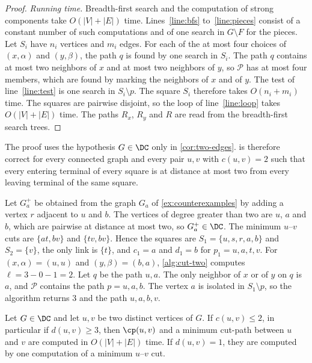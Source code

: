 \begin{proof}
\emph{Running time.}
Breadth-first search and the computation of strong components take $O(|V| + |E|)$ time.
Lines~\ref{line:bfs} to~\ref{line:pieces} consist of a constant number of such computations and of one search in $G \setminus F$ for the pieces.
Let $S_i$ have $n_i$ vertices and $m_i$ edges.
For each of the at most four choices of $(x, \alpha)$ and $(y, \beta)$, the path $q$ is found by one search in $S_i$.
The path $q$ contains at most two neighbors of $x$ and at most two neighbors of $y$, so $\mathcal{P}$ has at most four members, which are found by marking the neighbors of $x$ and of $y$.
The test of line~\ref{line:test} is one search in $S_i \setminus p$.
The square $S_i$ therefore takes $O(n_i + m_i)$ time.
The squares are pairwise disjoint, so the loop of line~\ref{line:loop} takes $O(|V| + |E|)$ time.
The paths $R_x$, $R_y$ and $R$ are read from the breadth-first search trees.
\end{proof}

The proof uses the hypothesis $G \in \DC$ only in \cref{cor:two-edges}.
 is therefore correct for every connected graph and every pair $u, v$ with $c(u, v) = 2$ such that every entering terminal of every square is at distance at most two from every leaving terminal of the same square.

\begin{example}
\label{ex:two-edges}
Let $G_a^{+}$ be obtained from the graph $G_a$ of \cref{ex:counterexamples} by adding a vertex $r$ adjacent to $u$ and $b$.
The vertices of degree greater than two are $u$, $a$ and $b$, which are pairwise at distance at most two, so $G_a^{+} \in \DC$.
The minimum $u$--$v$ cuts are $\{at, bv\}$ and $\{tv, bv\}$.
Hence the squares are $S_1 = \{u, s, r, a, b\}$ and $S_2 = \{v\}$, the only link is $\{t\}$, and $c_1 = a$ and $d_1 = b$ for $p_1 = u, a, t, v$.
For $(x, \alpha) = (u, u)$ and $(y, \beta) = (b, a)$, \cref{alg:cut-two} computes $\ell = 3 - 0 - 1 = 2$.
Let $q$ be the path $u, a$.
The only neighbor of $x$ or of $y$ on $q$ is $a$, and $\mathcal{P}$ contains the path $p = u, a, b$.
The vertex $a$ is isolated in $S_1 \setminus p$, so the algorithm returns $3$ and the path $u, a, b, v$.
\end{example}

\begin{corollary}
\label{cor:class-pairs}
Let $G \in \DC$ and let $u, v$ be two distinct vertices of $G$.
If $c(u, v) \leq 2$, in particular if $d(u, v) \geq 3$, then $\cp(u, v)$ and a minimum cut-path between $u$ and $v$ are computed in $O(|V| + |E|)$ time.
If $d(u, v) = 1$, they are computed by one computation of a minimum $u$--$v$ cut.
\end{corollary}

